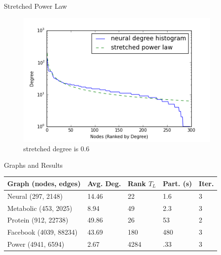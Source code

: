 \documentclass[xcolor=dvipsnames,10pt]{beamer}
\begin{document}
\begin{frame}{Stretched Power Law}

\begin{figure}
\begin{center}
\includegraphics[width=4in]{neuralsequenceplot.png}
\caption{stretched degree is 0.6}
  \end{center}
  \end{figure}

\end{frame}

\begin{frame}{Graphs and Results}
\renewcommand{\arraystretch}{1.5}
    \begin{tabular}{| l | l | l | l | l |}
    \hline
    Graph (nodes, edges) & Avg. Deg. & Rank $T_L$ & Part. (s) & Iter. \\ \hline
    Neural (297, 2148) \cite{Watts:1998,White:1986} & 14.46 & 22 & 1.6 & 3 \\ \hline
    Metabolic (453, 2025) \cite{Duch:2005} & 8.94 & 49 & 2.3 & 3 \\  \hline
    Protein (912, 22738) \cite{Simonis:2009} & 49.86 & 26 & 53 & 2 \\ \hline
    Facebook (4039, 88234) \cite{Mcauley:2012} & 43.69 & 180 & 480 & 3 \\ \hline
    Power (4941, 6594) \cite{Watts:1998} & 2.67 & 4284 & .33 & 3\\ 
    \hline
    \end{tabular}
\end{frame}
\end{document}
